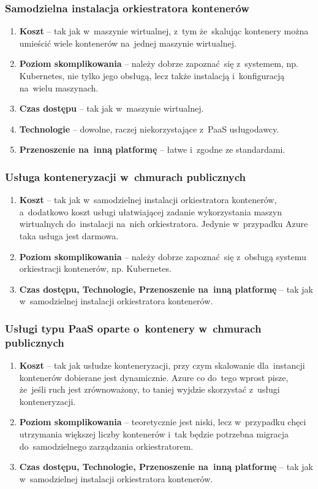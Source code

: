 \documentclass[12pt,a4paper,twoside,titlepage,openright]{book}
\begin{document}
\subsubsection{Samodzielna instalacja orkiestratora kontenerów}

\begin{enumerate}
	\item \textbf{Koszt} -- tak jak w~maszynie wirtualnej, z~tym że~skalując kontenery można umieścić wiele kontenerów na~jednej maszynie wirtualnej.
	\item \textbf{Poziom skomplikowania} -- należy dobrze zapoznać~się z~systemem, np. Kubernetes, nie tylko jego obsługą, lecz także instalacją i~konfiguracją na~wielu maszynach.
	\item \textbf{Czas dostępu} -- tak jak w~maszynie wirtualnej.
	\item \textbf{Technologie} -- dowolne, raczej niekorzystające z~PaaS usługodawcy.
	\item \textbf{Przenoszenie na~inną platformę} -- łatwe i~zgodne ze standardami.
\end{enumerate}

\subsubsection{Usługa konteneryzacji w~chmurach publicznych}

\begin{enumerate}
	\item \textbf{Koszt} -- tak jak w~samodzielnej instalacji orkiestratora kontenerów, a~dodatkowo koszt usługi ułatwiającej zadanie wykorzystania maszyn wirtualnych do~instalacji na~nich orkiestratora. Jedynie w~przypadku Azure taka usługa jest darmowa.
	\item \textbf{Poziom skomplikowania} -- należy dobrze zapoznać~się z~obsługą systemu orkiestracji kontenerów, np. Kubernetes.
	\item \textbf{Czas dostępu, Technologie, Przenoszenie na~inną platformę} -- tak jak w~samodzielnej instalacji orkiestratora kontenerów.
\end{enumerate}


\subsubsection{Usługi typu PaaS oparte o~kontenery w~chmurach publicznych}

\begin{enumerate}
	\item \textbf{Koszt} -- tak jak usłudze konteneryzacji, przy czym skalowanie dla~instancji kontenerów dobierane jest dynamicznie. Azure co do~tego wprost pisze, że~jeśli ruch jest zrównoważony, to taniej wyjdzie skorzystać z~usługi konteneryzacji.
	\item \textbf{Poziom skomplikowania} -- teoretycznie jest niski, lecz w~przypadku chęci utrzymania większej liczby kontenerów i~tak będzie potrzebna migracja do~samodzielnego zarządzania orkiestratorem.
	\item \textbf{Czas dostępu, Technologie, Przenoszenie na~inną platformę} -- tak jak w~samodzielnej instalacji orkiestratora kontenerów.
\end{enumerate}
\end{document}
